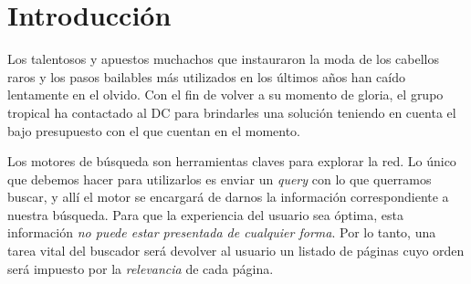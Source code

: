 \hypersetup{
    colorlinks,
    citecolor=black,
    filecolor=black,
    linkcolor=black,
    urlcolor=black
}


\lstset{escapechar=@,style=customc}




\fecha{\today}




\maketitle

\tableofcontents
\newpage

\section*{Introducción}

Los talentosos y apuestos muchachos que instauraron la moda de los cabellos raros y los pasos bailables más utilizados en los últimos años han caído lentamente en el olvido. Con el fin de volver a su momento de gloria, el grupo tropical ha contactado al DC para brindarles una solución teniendo en cuenta el bajo presupuesto con el que cuentan en el momento.

Los motores de búsqueda son herramientas claves para explorar la red. Lo único que debemos hacer para utilizarlos es enviar un \textit{query} con lo que querramos buscar, y allí el motor se encargará de darnos la información correspondiente a nuestra búsqueda. Para que la experiencia del usuario sea óptima, esta información \textit{no puede estar presentada de cualquier forma}. Por lo tanto, una tarea vital del buscador será devolver al usuario un listado de páginas cuyo orden será impuesto por la \textit{relevancia} de cada página. 

